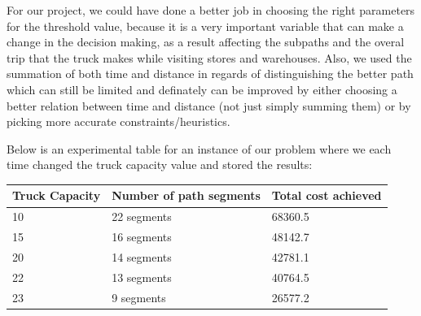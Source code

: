 \documentclass[journal,onecolumn]{IEEEtran}
\begin{document}
For our project, we could have done a better job in choosing the right parameters for the threshold value, because it is a very important variable that can make a change in the decision making, as a result affecting the subpaths and the overal trip that the truck makes while visiting stores and warehouses.
Also, we used the summation of both time and distance in regards of distinguishing the better path which can still be limited and definately can be improved by either choosing a better relation between time and distance (not just simply summing them) or by picking more accurate constraints/heuristics.


Below is an experimental table for an instance of our problem where we each time changed the truck capacity value and stored the results:
\begin{center}
	\begin{tabular}{ | l | l | p{5cm} |}
 		\hline
 		Truck Capacity & Number of path segments & Total cost achieved \\ \hline
 		10 & 22 segments & 68360.5  \\ \hline
		15 & 16 segments & 48142.7 \\ \hline
		20 & 14 segments & 42781.1  \\ \hline
		22 & 13 segments & 40764.5 \\ \hline
		23 & 9 segments & 26577.2 \\ \hline
	\end{tabular}
\end{center}




%
%
\end{document}
